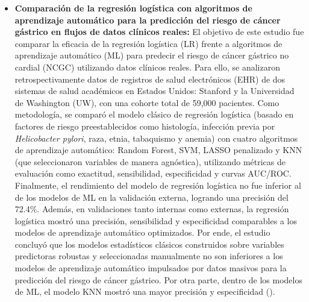 \begin{itemize}
\item \textbf{Comparación de la regresión logística con algoritmos de aprendizaje automático para la predicción del riesgo de cáncer gástrico en flujos de datos clínicos reales:} El objetivo de este estudio fue comparar la eficacia de la regresión logística (LR) frente a algoritmos de aprendizaje automático (ML) para predecir el riesgo de cáncer gástrico no cardial (NCGC) utilizando datos clínicos reales. Para ello, se analizaron retrospectivamente datos de registros de salud electrónicos (EHR) de dos sistemas de salud académicos en Estados Unidos: Stanford y la Universidad de Washington (UW), con una cohorte total de 59,000 pacientes. Como metodología, se comparó el modelo clásico de regresión logística (basado en factores de riesgo preestablecidos como histología, infección previa por \textit{Helicobacter pylori}, raza, etnia, tabaquismo y anemia) con cuatro algoritmos de aprendizaje automático: Random Forest, SVM, LASSO penalizado y KNN (que seleccionaron variables de manera agnóstica), utilizando métricas de evaluación como exactitud, sensibilidad, especificidad y curvas AUC/ROC. Finalmente, el rendimiento del modelo de regresión logística no fue inferior al de los modelos de ML en la validación externa, logrando una precisión del 72.4\%. Además, en validaciones tanto internas como externas, la regresión logística mostró una precisión, sensibilidad y especificidad comparables a los modelos de aprendizaje automático optimizados. Por ende, el estudio concluyó que los modelos estadísticos clásicos construidos sobre variables predictoras robustas y seleccionadas manualmente no son inferiores a los modelos de aprendizaje automático impulsados por datos masivos para la predicción del riesgo de cáncer gástrico. Por otra parte, dentro de los modelos de ML, el modelo KNN mostró una mayor precisión y especificidad (\cite{article5}).

\end{itemize}
